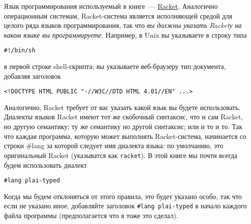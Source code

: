 
Язык программирования используемый в книге\ --- 
\href{http://www.racket-lang.org/}{Racket}. Аналогично операционным системам,
Racket-система является исполняющей средой для целого ряда языков
программирования, так что \emph{вы должны указать Racketу на каком языке 
вы программируете}. Например, в Unix вы указываете в строку типа

\begin{verbatim}
#!/bin/sh
\end{verbatim}

в первой строке shell-скрипта; вы указываете веб-браузеру
тип документа, добавляя заголовок

\begin{verbatim}
<!DOCTYPE HTML PUBLIC "-//W3C//DTD HTML 4.01//EN" ...>
\end{verbatim}

Аналогично, Racket требует от вас указать какой язык вы будете использовать.
Диалекты языков Racket имеют тот же скобочный синтаксис, что и сам Racket,
но другую семантику; ту же семантику но другой синтаксис; или и то и то.
Так что каждая программа, которую может выполнять Racket-система, начинается со
строки \#lang за которой следует имя диалекта языка: по умолчанию, 
это оригинальный Racket (указыватся как \verb|racket|). В этой книге мы 
почти всегда будем использовать диалект

\begin{verbatim}
#lang plai-typed
\end{verbatim}

Когда мы будем отклоняться от этого правила, это будет указано особо, так что
если не указано иное, добавляйте заголовок \verb|#lang plai-typed| в начало
каждого файла программы (предполагается что я тоже это сделал).


